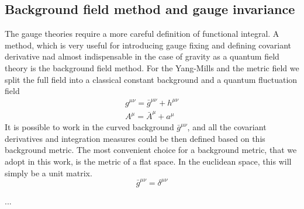 \documentclass[11pt, a4paper]{article}
\begin{document}
\subsection{Background field method and gauge invariance}
The gauge theories require a more careful definition of functional integral.
A method, which is very useful for
introducing gauge fixing and defining covariant derivative nad almost indispensable in the case of
gravity as a quantum field theory is the background field method.
For the Yang-Mills and the metric field we split the full field into a classical constant background
and a quantum fluctuation field
\begin{align}
    g^{\mu\nu} = \bar{g}^{\mu\nu} + h^{\mu\nu}\\
    A^{\mu} = \bar{A}^\mu + a^\mu
\end{align}
It is possible to work in the curved background $\bar{g}^{\mu\nu}$, and all the covariant derivatives and
integration measures could be then defined based on this background metric.
The most convenient choice for a background metric, that we adopt in this work, is the metric of a flat space.
In the euclidean space, this will simply be a unit matrix.
\begin{equation}
    \bar{g}^{\mu\nu} = \delta^{\mu\nu}
\end{equation}


...



\end{document}
